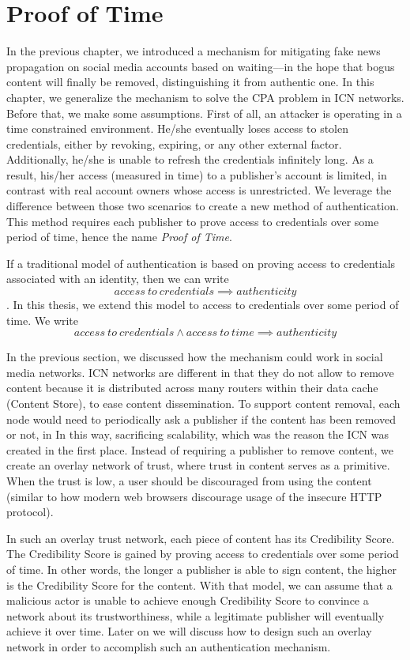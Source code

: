 \chapter{Proof of Time}
\label{proof-of-time}
In the previous chapter, we introduced a mechanism for mitigating fake news propagation on social media accounts based on waiting––in the hope that bogus content will finally be removed, distinguishing it from authentic one. In this chapter, we generalize the mechanism to solve the CPA problem in ICN networks. Before that, we make some assumptions. First of all, an attacker is operating in a time constrained environment. He/she eventually loses access to stolen credentials, either by revoking, expiring, or any other external factor. Additionally, he/she is unable to refresh the credentials infinitely long. As a result, his/her access (measured in time) to a publisher's account is limited, in contrast with real account owners whose access is unrestricted.
We leverage the difference between those two scenarios to create a new method of authentication. This method requires each publisher to prove access to credentials over some period of time, hence the name \textit{Proof of Time}.

If a traditional model of authentication is based on proving access to credentials associated with an identity, then we can write
\[access\ to\ credentials \implies authenticity\].
In this thesis, we extend this model to access to credentials over some period of time. We write
\[access\ to\ credentials \land access\ to\ time \implies authenticity\]

In the previous section, we discussed how the mechanism could work in social media networks. ICN networks are different in that they do not allow to remove content because it is distributed across many routers within their data cache (Content Store), to ease content dissemination. To support content removal, each node would need to periodically ask a publisher if the content has been removed or not, in In this way, sacrificing scalability, which was the reason the ICN was created in the first place. 
Instead of requiring a publisher to remove content, we create an overlay network of trust, where trust in content serves as a primitive. When the trust is low, a user should be discouraged from using the content (similar to how modern web browsers discourage usage of the insecure HTTP protocol). 

In such an overlay trust network, each piece of content has its Credibility Score. The Credibility Score is gained by proving access to credentials over some period of time. In other words, the longer a publisher is able to sign content, the higher is the Credibility Score for the content. With that model, we can assume that a malicious actor is unable to achieve enough Credibility Score to convince a network about its trustworthiness, while a legitimate publisher will eventually achieve it over time. Later on we will discuss how to design such an overlay network in order to accomplish such an authentication mechanism.

